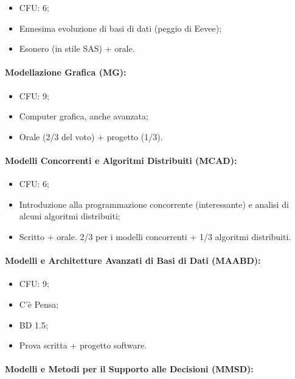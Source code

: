 \begin{itemize}
  \item CFU: 6;
  \item Ennesima evoluzione di basi di dati (peggio di Eevee);
  \item Esonero (in stile SAS) + orale.
\end{itemize}

\paragraph{Modellazione Grafica (MG):}

\begin{itemize}
  \item CFU: 9;
  \item Computer grafica, anche avanzata;
  \item Orale (2/3 del voto) + progetto (1/3).
\end{itemize}

\paragraph{Modelli Concorrenti e Algoritmi Distribuiti (MCAD):}

\begin{itemize}
  \item CFU: 6;
  \item Introduzione alla programmazione concorrente (interessante) e analisi di alcuni algoritmi distribuiti;
  \item Scritto + orale. 2/3 per i modelli concorrenti + 1/3 algoritmi distribuiti.
\end{itemize}

\paragraph{Modelli e Architetture Avanzati di Basi
di Dati (MAABD):}

\begin{itemize}
  \item CFU: 9;
  \item C'è Pensa;
  \item BD 1.5;
  \item Prova scritta + progetto software. 
\end{itemize}

\paragraph{Modelli e Metodi per il Supporto alle Decisioni (MMSD):}

